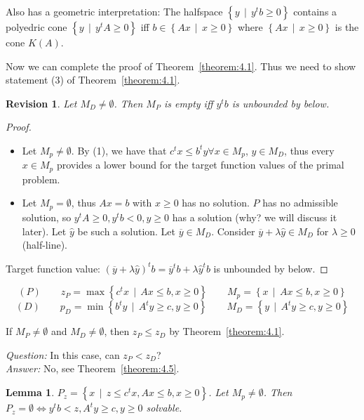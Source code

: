 \documentclass[a4paper]{article}
\newcounter{lecref}[section]
\numberwithin{lecref}{section}
\newtheorem{lemma}[lecref]{Lemma}
\newtheorem{revision}{Revision}
\newcommand{\SetDef}[2]{\left\{#1\,\mid\,#2\right\}}
\begin{document}
Also has a geometric interpretation:
The halfspace $\SetDef{y}{y^t b \geq 0}$ contains a polyedric cone $\SetDef{y}{y^t A \geq 0}$ %
iff $b \in \SetDef{Ax}{x \geq 0}$ where $\SetDef{Ax}{x \geq 0}$ is the cone $K(A)$.

Now we can complete the proof of Theorem~\ref{theorem:4.1}.
Thus we need to show statement (3) of Theorem~\ref{theorem:4.1}.

\begin{revision}
	Let $M_D \neq \emptyset$. Then $M_P$ is empty iff $y^t b$ is unbounded by below.
\end{revision}

\begin{proof}
	\begin{itemize}
		\item
			Let $M_p \neq \emptyset$. By (1), we have that $c^t x \leq b^t y \forall x \in M_p$, $y \in M_D$,
			thus every $x \in M_p$ provides a lower bound for the target function values of the primal problem.
		\item
			Let $M_p = \emptyset$, thus $Ax = b$ with $x \geq 0$ has no solution.
			$P$ has no admissible solution, so $y^t A \geq 0, y^t b < 0, y \geq 0$ has a solution (why? we will discuss it later).
			Let $\hat y$ be such a solution. Let $\overline y \in M_D$. Consider $\overline y + \lambda \hat y \in M_D$ for $\lambda \geq 0$ (half-line).
	\end{itemize}

	Target function value: $(\overline y + \lambda \hat y)^t b = \overline y^t b + \lambda \hat y^t b$ is unbounded by below.
\end{proof}

\[ (P) \qquad z_P = \max\SetDef{c^t x}{Ax \leq b, x \geq 0} \qquad M_p = \SetDef{x}{Ax \leq b, x \geq 0}  \]
\[ (D) \qquad p_D = \min\SetDef{b^t y}{A^t y \geq c, y \geq 0} \qquad M_D = \SetDef{y}{A^t y \geq c, y \geq 0} \]

If $M_P \neq \emptyset$ and $M_D \neq \emptyset$, then $z_P \leq z_D$ by Theorem~\ref{theorem:4.1}.


\emph{Question:} In this case, can $z_P < z_D$? \\
\emph{Answer:} No, see Theorem~\ref{theorem:4.5}.

\begin{lemma}
	\label{lemma:4.6}
	$P_z = \SetDef{x}{z \leq c^t x, Ax \leq b, x \geq 0}$.
	Let $M_p \neq \emptyset$. Then $P_z = \emptyset \iff y^t b < z, A^t y \geq c, y \geq 0$ solvable.
\end{lemma}
\end{document}
